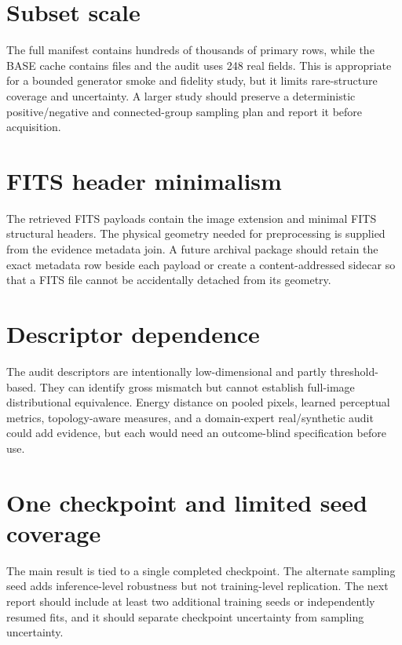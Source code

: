 \documentclass[11pt,oneside]{report}
\begin{document}
\section{Subset scale}

The full manifest contains hundreds of thousands of primary rows, while the BASE cache contains \AcquiredCount{} files and the audit uses 248 real fields. This is appropriate for a bounded generator smoke and fidelity study, but it limits rare-structure coverage and uncertainty. A larger study should preserve a deterministic positive/negative and connected-group sampling plan and report it before acquisition.

\section{FITS header minimalism}

The retrieved FITS payloads contain the image extension and minimal FITS structural headers. The physical geometry needed for preprocessing is supplied from the evidence metadata join. A future archival package should retain the exact metadata row beside each payload or create a content-addressed sidecar so that a FITS file cannot be accidentally detached from its geometry.

\section{Descriptor dependence}

The audit descriptors are intentionally low-dimensional and partly threshold-based. They can identify gross mismatch but cannot establish full-image distributional equivalence. Energy distance on pooled pixels, learned perceptual metrics, topology-aware measures, and a domain-expert real/synthetic audit could add evidence, but each would need an outcome-blind specification before use.

\section{One checkpoint and limited seed coverage}

The main result is tied to a single completed checkpoint. The alternate sampling seed adds inference-level robustness but not training-level replication. The next report should include at least two additional training seeds or independently resumed fits, and it should separate checkpoint uncertainty from sampling uncertainty.
\end{document}
